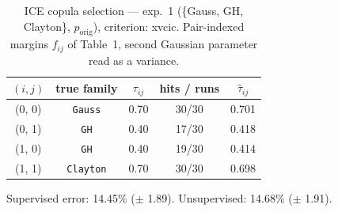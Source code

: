 \begin{table}[htbp]
  \centering
  \caption{ICE copula selection — exp.\ 1 (\{Gauss, GH, Clayton\}, $p_{\text{orig}}$), criterion: xvcic. Pair-indexed margins $f_{ij}$ of Table~1, second Gaussian parameter read as a variance.}
  \label{tab:exp3-exp1_orig_p__xvcic}
  \begin{tabular}{ccccc}
    \toprule
    $(i, j)$ & true family & $\tau_{ij}$ & hits / runs & $\hat\tau_{ij}$ \\
    \midrule
    (0, 0) & \texttt{Gauss} & 0.70 & 30/30 & 0.701 \\
    (0, 1) & \texttt{GH} & 0.40 & 17/30 & 0.418 \\
    (1, 0) & \texttt{GH} & 0.40 & 19/30 & 0.414 \\
    (1, 1) & \texttt{Clayton} & 0.70 & 30/30 & 0.698 \\
    \bottomrule
  \end{tabular}
  \par\smallskip Supervised error: 14.45\% ($\pm$ 1.89). Unsupervised: 14.68\% ($\pm$ 1.91).
\end{table}
